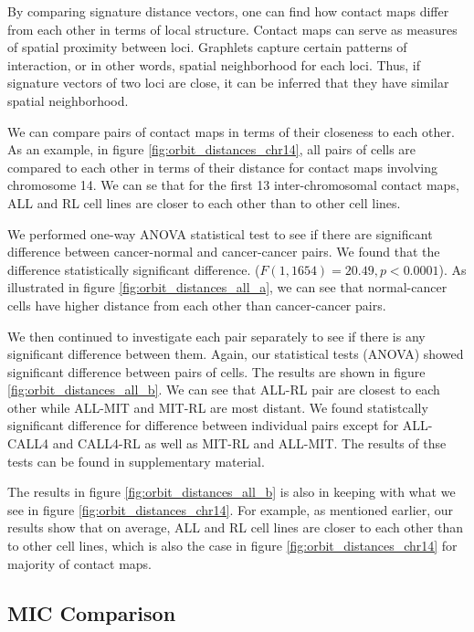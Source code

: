 \documentclass[a4,center,fleqn]{NAR}
\begin{document}
By comparing signature distance vectors, one can find
how contact maps
differ from each other in terms of local structure. 
Contact maps can serve as measures of spatial proximity between
loci. Graphlets capture certain patterns of interaction, or
in other words, spatial neighborhood for each loci. Thus, if
signature vectors of two loci are close,
 it can be inferred that they have 
similar spatial neighborhood.

We can compare pairs of contact maps in terms of their closeness
to each other. 
As an example, in figure
\ref{fig:orbit_distances_chr14}, all pairs of cells are
compared to each other in terms of their distance for contact
maps involving chromosome 14. We can se that 
for the first 13 inter-chromosomal 
contact maps, ALL and RL cell lines are closer to each other
than to other cell lines.

We performed one-way ANOVA statistical test to 
see if there are significant 
difference between cancer-normal and cancer-cancer pairs.
We found that the difference statistically significant difference.
($F(1, 1654) = 20.49, p < 0.0001$).
As illustrated in figure \ref{fig:orbit_distances_all_a},
we can see that normal-cancer cells have higher distance
from each other than cancer-cancer pairs.

We then continued to investigate each pair separately to
see if there is any significant difference between them.
Again, our statistical tests (ANOVA) showed significant difference
between pairs of cells.
The results are shown in figure \ref{fig:orbit_distances_all_b}.
We can see that ALL-RL pair are closest to each other while
ALL-MIT and MIT-RL are most distant. We found statistcally
significant difference for difference between individual
pairs except for ALL-CALL4 and CALL4-RL as well as
MIT-RL and ALL-MIT. The results of thse tests 
can be found in supplementary material.

The results in figure \ref{fig:orbit_distances_all_b} is also
in keeping with what we see in figure \ref{fig:orbit_distances_chr14}. For example, as mentioned earlier, our results show that
on average, ALL
and RL cell lines are closer to each other than to other
cell lines, which is also the case in figure
\ref{fig:orbit_distances_chr14} for majority of contact maps.

\subsection{MIC Comparison}
\end{document}
